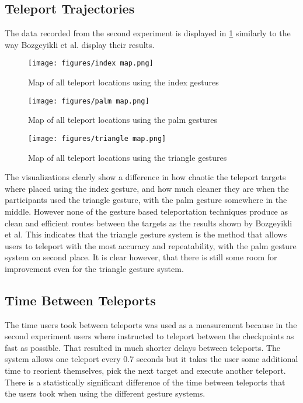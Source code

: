 
\subsection{Teleport Trajectories}
The data recorded from the second experiment is displayed in \ref{fig:exp2maps} similarly to the way Bozgeyikli et al. %
display their results. 

\begin{figure}[!htb]
        \texttt{[image: figures/index map.png]}
        \caption{Map of all teleport locations using the index gestures}\label{fig:map_index}
    \endminipage\hfill
        \texttt{[image: figures/palm map.png]}
        \caption{Map of all teleport locations using the palm gestures}\label{fig:map_palm}
    \endminipage\hfill
        \texttt{[image: figures/triangle map.png]}
        \caption{Map of all teleport locations using the triangle gestures}\label{fig:map_triangle}
        \label{fig:exp2maps}
    \endminipage
\end{figure}
    
The visualizations clearly show a difference in how chaotic the teleport targets where placed using the index gesture, and how much cleaner they are when the participants used the triangle gesture, with the palm gesture somewhere in the middle. However none of the gesture based teleportation techniques produce as clean and efficient routes between the targets as the results shown by Bozgeyikli et al. This indicates that the triangle gesture system is the method that allows users to teleport with the most accuracy and repeatability, with the palm gesture system on second place. It is clear however, that there is still some room for improvement even for the triangle gesture system. 

\subsection{Time Between Teleports}
The time users took between teleports was used as a measurement because in the second experiment users where instructed to teleport between the checkpoints as fast as possible. That resulted in much shorter delays between teleports. The system allows one teleport every 0.7 seconds but it takes the user some additional time to reorient themselves, pick the next target and execute another teleport. There is a statistically significant difference of the time between teleports that the users took when using the different gesture systems. 

